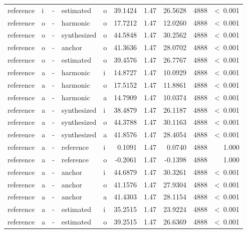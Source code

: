\documentclass[a4paper,man,hidelinks,floatsintext]{apa7}
\begin{document}
\begin{table}[!htbp]
\begin{adjustbox}{max size={\columnwidth}{\textheight}}
\begin{tabular}{llrllrrrrr}
reference   & i     & - & estimated   & o     &    39.1424 & 1.47 &  26.5628 & 4888 &  \textless~0.001 \\
reference   & o     & - & harmonic    & o     &    17.7212 & 1.47 &  12.0260 & 4888 &  \textless~0.001 \\
reference   & o     & - & synthesized & o     &    44.5848 & 1.47 &  30.2562 & 4888 &  \textless~0.001 \\
reference   & o     & - & anchor      & o     &    41.3636 & 1.47 &  28.0702 & 4888 &  \textless~0.001 \\
reference   & o     & - & estimated   & o     &    39.4576 & 1.47 &  26.7767 & 4888 &  \textless~0.001 \\
reference   & a     & - & harmonic    & i     &    14.8727 & 1.47 &  10.0929 & 4888 &  \textless~0.001 \\
reference   & a     & - & harmonic    & o     &    17.5152 & 1.47 &  11.8861 & 4888 &  \textless~0.001 \\
reference   & a     & - & harmonic    & a     &    14.7909 & 1.47 &  10.0374 & 4888 &  \textless~0.001 \\
reference   & a     & - & synthesized & i     &    38.4879 & 1.47 &  26.1187 & 4888 &  \textless~0.001 \\
reference   & a     & - & synthesized & o     &    44.3788 & 1.47 &  30.1163 & 4888 &  \textless~0.001 \\
reference   & a     & - & synthesized & a     &    41.8576 & 1.47 &  28.4054 & 4888 &  \textless~0.001 \\
reference   & a     & - & reference   & i     &     0.1091 & 1.47 &   0.0740 & 4888 &            1.000 \\
reference   & a     & - & reference   & o     &    -0.2061 & 1.47 &  -0.1398 & 4888 &            1.000 \\
reference   & a     & - & anchor      & i     &    44.6879 & 1.47 &  30.3261 & 4888 &  \textless~0.001 \\
reference   & a     & - & anchor      & o     &    41.1576 & 1.47 &  27.9304 & 4888 &  \textless~0.001 \\
reference   & a     & - & anchor      & a     &    41.4303 & 1.47 &  28.1154 & 4888 &  \textless~0.001 \\
reference   & a     & - & estimated   & i     &    35.2515 & 1.47 &  23.9224 & 4888 &  \textless~0.001 \\
reference   & a     & - & estimated   & o     &    39.2515 & 1.47 &  26.6369 & 4888 &  \textless~0.001 \\

\end{tabular}
\end{adjustbox}
\end{table}
\end{document}

